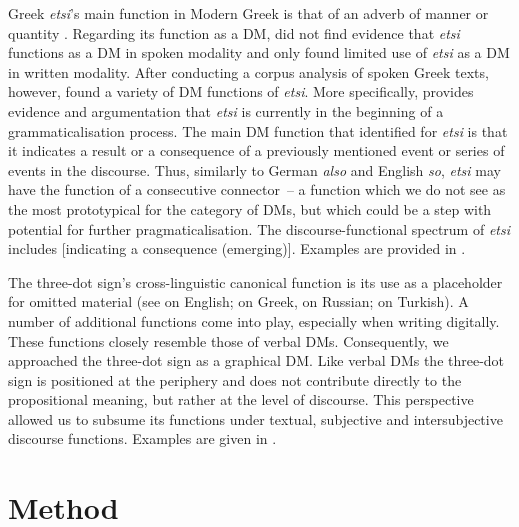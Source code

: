 \documentclass[output=paper,colorlinks,citecolor=brown]{langscibook}
\begin{document}
Greek \textit{etsi}’s main function in Modern Greek is that of an adverb of manner or quantity \citep{tzartzanos_greek_2002}. Regarding its function as a DM, \citet{georgakopoulou_conjunctions_1998} did not find evidence that \textit{etsi} functions as a DM in spoken modality and only found limited use of \textit{etsi} as a DM in written modality. After conducting a corpus analysis of spoken Greek texts, however, \citet{tsampoukas_grammaticalization_2015} found a variety of DM functions of \textit{etsi}. More specifically, \citet{tsampoukas_grammaticalization_2015} provides evidence and argumentation that \textit{etsi} is currently in the beginning of a grammaticalisation process. The main DM function that \citet{tsampoukas_grammaticalization_2015} identified for \textit{etsi} is that it indicates a result or a consequence of a previously mentioned event or series of events in the discourse. Thus, similarly to German \textit{also} and English \textit{so}, \textit{etsi} may have the function of a consecutive connector~-- a function which we do not see as the most prototypical for the category of DMs, but which could be a step with potential for further pragmaticalisation. The discourse-functional spectrum of \textit{etsi} includes [indicating a consequence (emerging)]. Examples are provided in .

The three-dot sign's cross-linguistic canonical function is its use as a placeholder for omitted material (see \cites[301]{raclaw_punctuation_2006}[60]{baron_necessary_2011} on English; \cites[125]{bredel_interpunktion_2008}[68]{meibauer_how_2019}[154]{androutsopoulos_auslassungspunkte_2020} on Greek, \citealt[90]{rosenthal_spravochnik_2012} on Russian; \citealt[44 ff.]{turan_turk_2014} on Turkish). A number of additional functions come into play, especially when writing digitally. These functions closely resemble those of verbal DMs. Consequently, we approached the three-dot sign as a graphical DM. Like verbal DMs the three-dot sign is positioned at the periphery and does not contribute directly to the propositional meaning, but rather at the level of discourse. This perspective allowed us to subsume its functions under textual, subjective and intersubjective discourse functions. Examples are given in .

\section{Method}
\label{sec:labrenzetal:Method}
\end{document}
